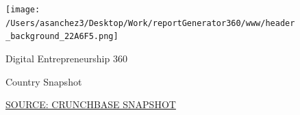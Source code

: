 \documentclass{article}\usepackage[]{graphicx}\usepackage[]{color}
\makeatletter
\newenvironment{kframe}{%
 \def\at@end@of@kframe{}%
 \ifinner\ifhmode%
  \def\at@end@of@kframe{\end{minipage}}%
  \begin{minipage}{\columnwidth}%
 \fi\fi%
 \def\FrameCommand##1{\hskip\@totalleftmargin \hskip-\fboxsep
 \colorbox{shadecolor}{##1}\hskip-\fboxsep
     \hskip-\linewidth \hskip-\@totalleftmargin \hskip\columnwidth}%
 \MakeFramed {\advance\hsize-\width
   \@totalleftmargin\z@ \linewidth\hsize
   \@setminipage}}%
 {\par\unskip\endMakeFramed%
 \at@end@of@kframe}
\makeatother
\begin{document}
%



\begin{figure}
  \vspace{-3ex} %
\end{figure}

\begin{figure}
  \vspace{-1ex} %
  \texttt{[image: /Users/asanchez3/Desktop/Work/reportGenerator360/www/header\_background\_22A6F5.png]}
\end{figure}

\begin{figure}
\begin{minipage}[t]{0.99\textwidth} %
  \vspace*{-26.8cm}
  \begin{minipage}[t]{0.48\textwidth} %
    \vspace{-1ex}
    \begin{minipage}[t]{0.99\textwidth} %
      \hspace{5ex}\raggedright\Large{\color{white}Digital Entrepreneurship 360}
    \end{minipage}
  
    \begin{minipage}[b]{0.99\textwidth} 
      \vspace{4ex}
    \end{minipage}
    
    \begin{minipage}[t]{0.99\textwidth} %
      \vspace{4ex}
      \hspace{5ex}\raggedright\large{\color{white}Country Snapshot}
    \end{minipage}  
  \end{minipage}
  \begin{minipage}[t]{0.56\textwidth} %
    \vspace{-4ex}
    \begin{minipage}[c]{0.30\textwidth}
\begin{kframe}


{\ttfamily\noindent\bfseries{}}\end{kframe}
    \vspace{-2ex}
    \hspace{2ex}\tiny{\href{https://data.crunchbase.com/docs/2013-snapshot}{\textcolor[HTML]{22A6F5}{SOURCE: CRUNCHBASE SNAPSHOT}}}
    \vspace{3ex}
    \end{minipage}
    \begin{minipage}[c]{0.30\textwidth}



\end{minipage}
\end{minipage}
\end{minipage}
\end{figure}
\end{document}
